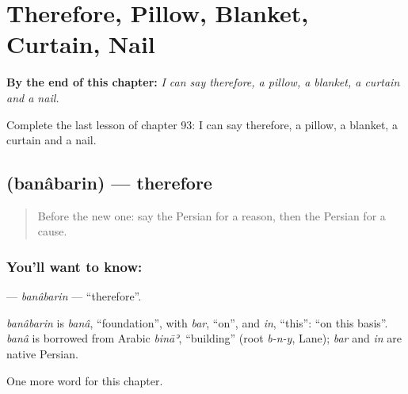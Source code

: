 
\chapter{Therefore, Pillow, Blanket, Curtain, Nail}
\label{ch:fa-therefore-pillow-blanket-curtain-nail}

\begin{chapteropening}
\textbf{By the end of this chapter:} \emph{I can say therefore, a pillow, a blanket, a curtain and a nail.}

Complete the last lesson of chapter 93: I can say therefore, a pillow, a blanket, a curtain and a nail.
\end{chapteropening}

\section[\texorpdfstring{\fa{بنابراین} (banâbarin)}{بنابراین (banâbarin)}]{ (banâbarin) — therefore}

\label{lesson:FA-C93-banabarin}



\begin{quote}
Before the new one: say the Persian for a reason, then the Persian for a cause.
\end{quote}

\subsection*{You'll want to know: }
\textbf{} — \emph{banâbarin} — \textquotedblleft{}therefore\textquotedblright{}.

\begin{cousinweb}
\emph{banâbarin} is \emph{banâ}, \textquotedblleft{}foundation\textquotedblright{}, with \emph{bar}, \textquotedblleft{}on\textquotedblright{}, and \emph{in}, \textquotedblleft{}this\textquotedblright{}: \textquotedblleft{}on this basis\textquotedblright{}. \emph{banâ} is borrowed from Arabic \emph{bināʾ}, \textquotedblleft{}building\textquotedblright{} (root \emph{b-n-y}, Lane); \emph{bar} and \emph{in} are native Persian.
\end{cousinweb}

\begin{grammarlens}[title={What you've built}]
One more word for this chapter.
\end{grammarlens}

